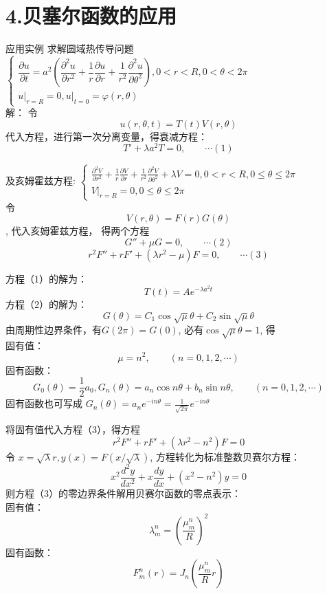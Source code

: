\section{4.贝塞尔函数的应用}

	{应用实例}
	求解圆域热传导问题 \\
	$\left\{
		\begin{array}{l}
		\dfrac{\partial u}{\partial t}=a^{2}\left(\dfrac{\partial^{2} u}{\partial r^{2}}+\dfrac{1}{r} 
		\dfrac{\partial u}{\partial r}+\dfrac{1}{r^{2}} \dfrac{\partial^{2} u}{\partial \theta^{2}}\right), 0<r<R, 0<\theta<2 \pi \\
		\left. u\right|_{r=R}=0,\left.u\right|_{t=0}=\varphi(r, \theta)
	\end{array}
	\right. $\\
	{\alert{解：}} 令 
	\begin{equation*}
		u(r,\theta,t)= T(t) V(r, \theta) 
	\end{equation*}	
	代入方程，进行第一次分离变量，得衰减方程：\[T'+\lambda a^2 T=0, \qquad \cdots (1) \]	



	及亥姆霍兹方程:
	$\left\{
	\begin{array}{l}
		\frac{\partial^{2} V}{\partial r^{2}}+\frac{1}{r} \frac{\partial V}{\partial r}+\frac{1}{r^{2}} 
		\frac{\partial^{2} V}{\partial \theta^{2}}+\lambda V=0, 0<r<R, 
		0 \leq \theta \leq 2 \pi \\
		\left.V\right|_{r=R}=0, 0 \leq \theta \leq 2 \pi
		\end{array}
	\right.$\\
	令\[V(r, \theta) =F(r)G(\theta)\], 代入亥姆霍兹方程， 得两个方程\\
	\[G''+\mu G=0, \qquad \cdots (2) \]
	\[r^2 F''+r F' +(\lambda r^2 -\mu )F=0, \qquad \cdots (3) \]



	方程（1）的解为：\[T(t)=Ae^{-\lambda a^2 t}\]
	方程（2）的解为：\[G(\theta)=C_1\cos\sqrt{\mu}\theta + C_2\sin \sqrt{\mu}\theta \]
	由周期性边界条件，有$G(2\pi)=G(0)$, 必有$\cos \sqrt{\mu}\theta =1 $, 得\\
	固有值：
	\[\mu = n^2, \qquad (n=0,1,2,\cdots)\]
	固有函数：
	\[G_0(\theta)=\frac{1}{2}a_0, G_n(\theta)= a_n\cos n \theta + b_n \sin n \theta, \qquad (n=0,1,2,\cdots)\]
	固有函数也可写成 $ G_n(\theta)=a_n e^{-i n \theta} =\frac{1}{\sqrt{2\pi}} e^{-i n \theta}$



	将固有值代入方程（3），得方程 
	\[r^2 F''+r F' +(\lambda r^2 -n^2 )F=0 \]
	令 $x=\sqrt{\lambda} r, y(x)=F(x/\sqrt{\lambda})$, 
	方程转化为标准整数贝赛尔方程：
	\begin{equation*}
		x^2\frac{d^2y}{dx^2} + x\frac{dy}{dx} +(x^2 -n^2)y=0
	\end{equation*}
	则方程（3）的零边界条件解用贝赛尔函数的零点表示：\\
	固有值：
	\[\lambda_m ^n =(\frac{\mu_{m}^{n}}{R})^2 \]
	固有函数：\[F_m ^n(r) = J_n (\frac{\mu_{m}^{n}}{R}r) \]



